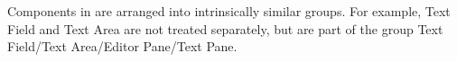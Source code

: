 \item[Concrete Component Group]{Components in \gd are arranged into intrinsically similar groups. For example, Text Field and Text Area are not treated separately, 
but are part of the group Text Field/Text Area/Editor Pane/Text Pane.
}
